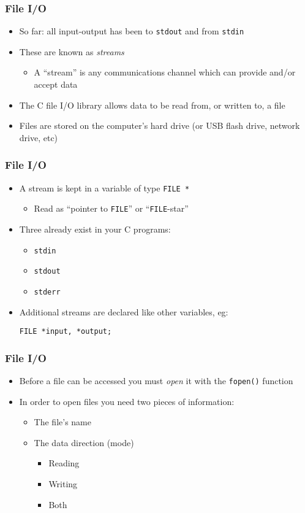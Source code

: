 \documentclass[14pt]{beamer}
\begin{document}
\begin{frame}
\frametitle{File I/O}
\begin{itemize}
\item So far: all input-output has been to \texttt{stdout} and from \texttt{stdin}
\item These are known as \textit{streams}
	\begin{itemize}
		\item A ``stream'' is any communications channel which can provide and/or accept data
	\end{itemize}
\item The C file I/O library allows data to be read from, or written to, a file
\item Files are stored on the computer's hard drive (or USB flash drive, network drive, etc)
\end{itemize}
\end{frame}

\begin{frame}[fragile]
\frametitle{File I/O}
\begin{itemize}
\item A stream is kept in a variable of type \texttt{FILE~*}
	\begin{itemize}
		\item Read as ``pointer to \texttt{FILE}'' or ``\texttt{FILE}-star''
	\end{itemize}
\item Three already exist in your C programs:
	\begin{itemize}
		\item \texttt{stdin}
		\item \texttt{stdout}
		\item \texttt{stderr}
	\end{itemize}
\item Additional streams are declared like other variables, eg:
\begin{lstlisting}[style=CStyle]
FILE *input, *output;
\end{lstlisting}
\end{itemize}
\end{frame}

\begin{frame}[fragile]
\frametitle{File I/O}
\begin{itemize}
\item Before a file can be accessed you must \textit{open} it with the \texttt{fopen()} function
\item In order to open files you need two pieces of information:
	\begin{itemize}
		\item The file's name
		\item The data direction (mode)
			\begin{itemize}
				\item Reading
				\item Writing
				\item Both
			\end{itemize}
	\end{itemize}
\end{itemize}
\end{frame}
\end{document}
